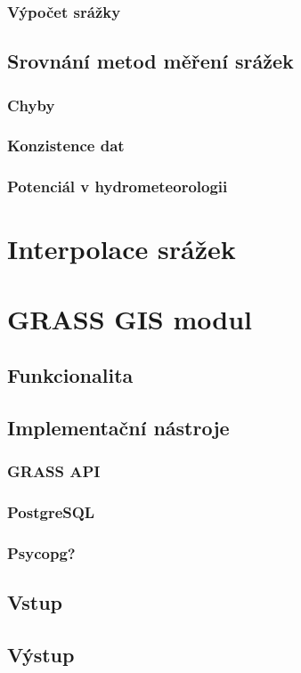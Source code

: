 \documentclass[a4paper,12pt]{article}
\begin{document}
\subsubsection{Výpočet srážky}
\subsection{Srovnání metod měření srážek}
\subsubsection{Chyby}
\subsubsection{Konzistence dat}

\subsubsection{Potenciál v hydrometeorologii}
\section{Interpolace srážek}
\section{GRASS GIS modul}
\subsection{Funkcionalita}
\subsection{Implementační nástroje}
\subsubsection{GRASS API}
\subsubsection{PostgreSQL}
\subsubsection{Psycopg?}
\subsection{Vstup}   
\subsection{Výstup}
\end{document}
